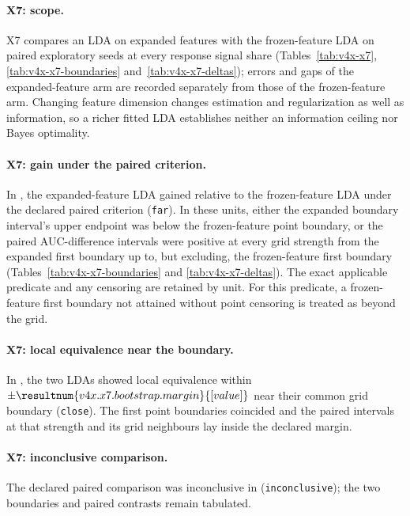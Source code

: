 \paragraph{X7: scope.}
X7 compares an LDA on expanded features with the frozen-feature LDA on paired exploratory seeds at every response signal share (Tables~\ref{tab:v4x-x7}, \ref{tab:v4x-x7-boundaries} and~\ref{tab:v4x-x7-deltas}); errors and gaps of the expanded-feature arm are recorded separately from those of the frozen-feature arm.
Changing feature dimension changes estimation and regularization as well as information, so a richer fitted LDA establishes neither an information ceiling nor Bayes optimality.

\paragraph{X7: gain under the paired criterion.}
In  , the expanded-feature LDA gained relative to the frozen-feature LDA under the declared paired criterion (\texttt{far}).
In these units, either the expanded boundary interval's upper endpoint was below the frozen-feature point boundary, or the paired AUC-difference intervals were positive at every grid strength from the expanded first boundary up to, but excluding, the frozen-feature first boundary (Tables~\ref{tab:v4x-x7-boundaries} and \ref{tab:v4x-x7-deltas}).
The exact applicable predicate and any censoring are retained by unit.
For this predicate, a frozen-feature first boundary not attained without point censoring is treated as beyond the grid.

\paragraph{X7: local equivalence near the boundary.}
In  , the two LDAs showed local equivalence within $\pm\resultnum{v4x.x7.bootstrap.margin}{[value]}$ near their common grid boundary (\texttt{close}).
The first point boundaries coincided and the paired intervals at that strength and its grid neighbours lay inside the declared margin.

\paragraph{X7: inconclusive comparison.}
The declared paired comparison was inconclusive in   (\texttt{inconclusive}); the two boundaries and paired contrasts remain tabulated.

